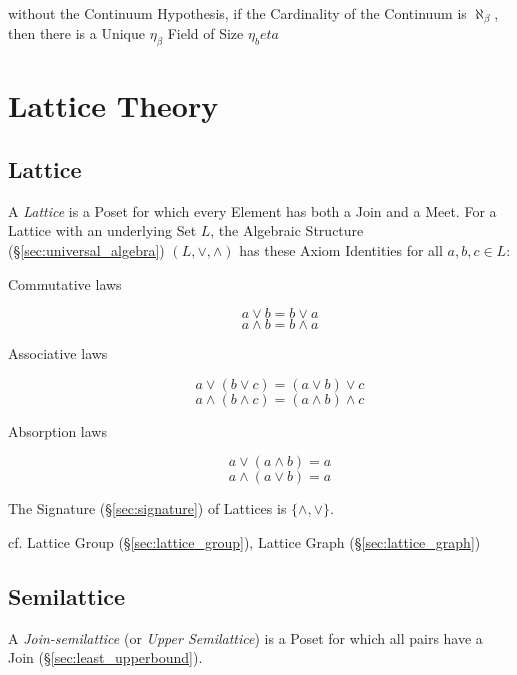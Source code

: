 without the Continuum Hypothesis, if the Cardinality of the Continuum is
$\aleph_\beta$, then there is a Unique $\eta_\beta$ Field of Size $\eta_beta$



\section{Lattice Theory}\label{sec:lattice_theory}

\subsection{Lattice}\label{sec:lattice}

A \emph{Lattice} is a Poset for which every Element has both a Join
and a Meet. For a Lattice with an underlying Set $L$, the Algebraic
Structure (\S\ref{sec:universal_algebra}) $(L, \vee, \wedge)$ has
these Axiom Identities for all $a,b,c \in L$:
\begin{description}
\item[Commutative laws]
\[
    a \vee b = b \vee a
\] \[
    a \wedge b = b \wedge a
\]
\item[Associative laws]
\[
    a \vee (b \vee c) = (a \vee b) \vee c
\] \[
    a \wedge (b \wedge c) = (a \wedge b) \wedge c
\]
\item[Absorption laws]
\[
    a \vee (a \wedge b) = a
\] \[
    a \wedge (a \vee b) = a
\]
\end{description}
The Signature (\S\ref{sec:signature}) of Lattices is
$\{\wedge, \vee\}$.

cf. Lattice Group (\S\ref{sec:lattice_group}), Lattice Graph
(\S\ref{sec:lattice_graph})



\subsection{Semilattice}\label{sec:semilattice}

A \emph{Join-semilattice} (or \emph{Upper Semilattice}) is a Poset for
which all pairs have a Join (\S\ref{sec:least_upperbound}).

